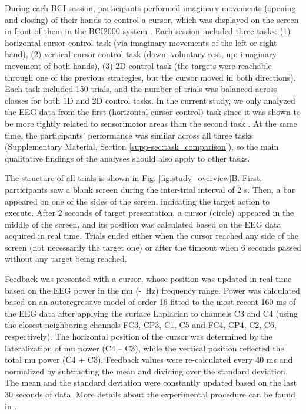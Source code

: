 During each BCI session, participants performed imaginary movements (opening and closing) of their hands to control a cursor, which was displayed on the screen in front of them in the BCI2000 system \citep{BCI2000_Schalk2004}. Each session included three tasks: (1) horizontal cursor control task (via imaginary movements of the left or right hand), (2) vertical cursor control task (down: voluntary rest, up: imaginary movement of both hands), (3) 2D control task (the targets were reachable through one of the previous strategies, but the cursor moved in both directions). Each task included 150 trials, and the number of trials was balanced across classes for both 1D and 2D control tasks. In the current study, we only analyzed the EEG data from the first (horizontal cursor control) task since it was shown to be more tightly related to sensorimotor areas than the second task \citep{Stieger2020_analysis}. At the same time, the participants' performance was similar across all three tasks (Supplementary Material, Section \ref{supp-sec:task_comparison}), so the main qualitative findings of the analyses should also apply to other tasks.

\medskip

The structure of all trials is shown in Fig. \ref{fig:study_overview}B. First, participants saw a blank screen during the inter-trial interval of 2 s. Then, a bar appeared on one of the sides of the screen, indicating the target action to execute. After 2 seconds of target presentation, a cursor (circle) appeared in the middle of the screen, and its position was calculated based on the EEG data acquired in real time. Trials ended either when the cursor reached any side of the screen (not necessarily the target one) or after the timeout when 6 seconds passed without any target being reached.

\medskip

Feedback was presented with a cursor, whose position was updated in real time based on the EEG power in the mu (\muLow-\muHigh~Hz) frequency range. Power was calculated based on an autoregressive model of order 16 fitted to the most recent 160 ms of the EEG data after applying the surface Laplacian to channels C3 and C4 (using the closest neighboring channels FC3, CP3, C1, C5 and FC4, CP4, C2, C6, respectively). The horizontal position of the cursor was determined by the lateralization of mu power (C4 -- C3), while the vertical position reflected the total mu power (C4 + C3). Feedback values were re-calculated every 40 ms and normalized by subtracting the mean and dividing over the standard deviation. The mean and the standard deviation were constantly updated based on the last 30 seconds of data. More details about the experimental procedure can be found in \citep{Stieger2020_analysis, Stieger2021_dataset}.

